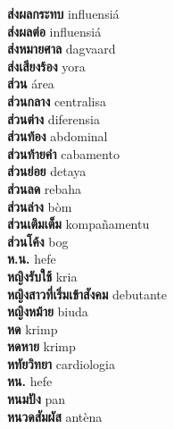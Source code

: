 \textbf{ ส่งผลกระทบ  } influensiá \\
\textbf{ ส่งผลต่อ  } influensiá \\
\textbf{ ส่งหมายศาล  } dagvaard \\
\textbf{ ส่งเสียงร้อง  } yora \\
\textbf{ ส่วน  } área \\
\textbf{ ส่วนกลาง  } centralisa \\
\textbf{ ส่วนต่าง  } diferensia \\
\textbf{ ส่วนท้อง  } abdominal \\
\textbf{ ส่วนท้ายคำ  } cabamento \\
\textbf{ ส่วนย่อย  } detaya \\
\textbf{ ส่วนลด  } rebaha \\
\textbf{ ส่วนล่าง  } bòm \\
\textbf{ ส่วนเติมเต็ม  } kompañamentu \\
\textbf{ ส่วนโค้ง  } bog \\
\textbf{ ห.น.  } hefe \\
\textbf{ หญิงรับใช้  } kria \\
\textbf{ หญิงสาวที่เริ่มเข้าสังคม  } debutante \\
\textbf{ หญิงหม้าย  } biuda \\
\textbf{ หด  } krimp \\
\textbf{ หดหาย  } krimp \\
\textbf{ หทัยวิทยา  } cardiologia \\
\textbf{ หน.  } hefe \\
\textbf{ หนมปัง  } pan \\
\textbf{ หนวดสัมผัส  } antèna \\
